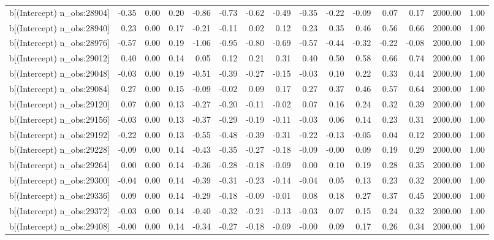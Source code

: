 \begin{table}[ht]
\begin{tabular}{rrrrrrrrrrrrrrr}
  b[(Intercept) n\_obs:28904] & -0.35 & 0.00 & 0.20 & -0.86 & -0.73 & -0.62 & -0.49 & -0.35 & -0.22 & -0.09 & 0.07 & 0.17 & 2000.00 & 1.00 \\ 
  b[(Intercept) n\_obs:28940] & 0.23 & 0.00 & 0.17 & -0.21 & -0.11 & 0.02 & 0.12 & 0.23 & 0.35 & 0.46 & 0.56 & 0.66 & 2000.00 & 1.00 \\ 
  b[(Intercept) n\_obs:28976] & -0.57 & 0.00 & 0.19 & -1.06 & -0.95 & -0.80 & -0.69 & -0.57 & -0.44 & -0.32 & -0.22 & -0.08 & 2000.00 & 1.00 \\ 
  b[(Intercept) n\_obs:29012] & 0.40 & 0.00 & 0.14 & 0.05 & 0.12 & 0.21 & 0.31 & 0.40 & 0.50 & 0.58 & 0.66 & 0.74 & 2000.00 & 1.00 \\ 
  b[(Intercept) n\_obs:29048] & -0.03 & 0.00 & 0.19 & -0.51 & -0.39 & -0.27 & -0.15 & -0.03 & 0.10 & 0.22 & 0.33 & 0.44 & 2000.00 & 1.00 \\ 
  b[(Intercept) n\_obs:29084] & 0.27 & 0.00 & 0.15 & -0.09 & -0.02 & 0.09 & 0.17 & 0.27 & 0.37 & 0.46 & 0.57 & 0.64 & 2000.00 & 1.00 \\ 
  b[(Intercept) n\_obs:29120] & 0.07 & 0.00 & 0.13 & -0.27 & -0.20 & -0.11 & -0.02 & 0.07 & 0.16 & 0.24 & 0.32 & 0.39 & 2000.00 & 1.00 \\ 
  b[(Intercept) n\_obs:29156] & -0.03 & 0.00 & 0.13 & -0.37 & -0.29 & -0.19 & -0.11 & -0.03 & 0.06 & 0.14 & 0.23 & 0.31 & 2000.00 & 1.00 \\ 
  b[(Intercept) n\_obs:29192] & -0.22 & 0.00 & 0.13 & -0.55 & -0.48 & -0.39 & -0.31 & -0.22 & -0.13 & -0.05 & 0.04 & 0.12 & 2000.00 & 1.00 \\ 
  b[(Intercept) n\_obs:29228] & -0.09 & 0.00 & 0.14 & -0.43 & -0.35 & -0.27 & -0.18 & -0.09 & -0.00 & 0.09 & 0.19 & 0.29 & 2000.00 & 1.00 \\ 
  b[(Intercept) n\_obs:29264] & 0.00 & 0.00 & 0.14 & -0.36 & -0.28 & -0.18 & -0.09 & 0.00 & 0.10 & 0.19 & 0.28 & 0.35 & 2000.00 & 1.00 \\ 
  b[(Intercept) n\_obs:29300] & -0.04 & 0.00 & 0.14 & -0.39 & -0.31 & -0.23 & -0.14 & -0.04 & 0.05 & 0.13 & 0.23 & 0.32 & 2000.00 & 1.00 \\ 
  b[(Intercept) n\_obs:29336] & 0.09 & 0.00 & 0.14 & -0.29 & -0.18 & -0.09 & -0.01 & 0.08 & 0.18 & 0.27 & 0.37 & 0.45 & 2000.00 & 1.00 \\ 
  b[(Intercept) n\_obs:29372] & -0.03 & 0.00 & 0.14 & -0.40 & -0.32 & -0.21 & -0.13 & -0.03 & 0.07 & 0.15 & 0.24 & 0.32 & 2000.00 & 1.00 \\ 
  b[(Intercept) n\_obs:29408] & -0.00 & 0.00 & 0.14 & -0.34 & -0.27 & -0.18 & -0.09 & -0.00 & 0.09 & 0.17 & 0.26 & 0.34 & 2000.00 & 1.00 \\ 

\end{tabular}
\end{table}
